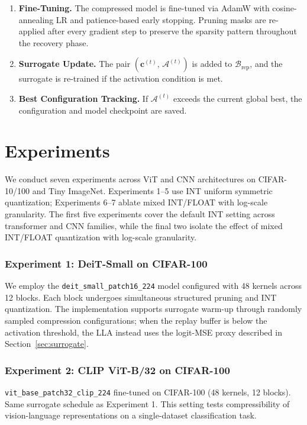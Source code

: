 \documentclass[preprint,12pt,authoryear]{elsarticle}
\begin{document}
\begin{enumerate}
    \item \textbf{Fine-Tuning.} The compressed model is fine-tuned via AdamW with
          cosine-annealing LR and patience-based early stopping. Pruning masks are
          re-applied after every gradient step to preserve the sparsity pattern
          throughout the recovery phase.

    \item \textbf{Surrogate Update.} The pair $(\mathbf{c}^{(t)},\, \mathcal{A}^{(t)})$
          is added to $\mathcal{B}_{\mathrm{rep}}$, and the surrogate is re-trained if
          the activation condition is met.

    \item \textbf{Best Configuration Tracking.} If $\mathcal{A}^{(t)}$ exceeds the
          current global best, the configuration and model checkpoint are saved.
\end{enumerate}


\section{Experiments}
\label{sec:exp_descriptions}

We conduct seven experiments across ViT and CNN architectures on CIFAR-10/100 and Tiny ImageNet. Experiments 1--5 use INT uniform symmetric quantization; Experiments 6--7 ablate mixed INT/FLOAT with log-scale granularity. The first five experiments cover the default INT setting across transformer and CNN families, while the final two isolate the effect of mixed INT/FLOAT quantization with log-scale granularity.

\subsubsection*{Experiment 1: DeiT-Small on CIFAR-100}
We employ the \texttt{deit\_small\_patch16\_224} model \citep{touvron2021training} configured with 48 kernels across 12 blocks. Each block undergoes simultaneous structured pruning and INT quantization. The implementation supports surrogate warm-up through randomly sampled compression configurations; when the replay buffer is below the activation threshold, the LLA instead uses the logit-MSE proxy described in Section~\ref{sec:surrogate}.

\subsubsection*{Experiment 2: CLIP ViT-B/32 on CIFAR-100}
\texttt{vit\_base\_patch32\_clip\_224} \citep{radford2021learning} fine-tuned on CIFAR-100 (48 kernels, 12 blocks). Same surrogate schedule as Experiment 1. This setting tests compressibility of vision-language representations on a single-dataset classification task.
\end{document}
